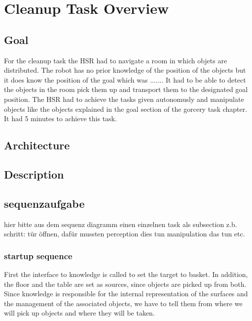 \documentclass[main.tex]{subfiles}
\begin{document}
	\begingroup

	\renewcommand{\cleardoublepage}{}

	\renewcommand{\clearpage}{}

	\chapter{Cleanup Task Overview}

		
		\section{Goal}
		For the cleanup task the HSR had to navigate a room in which objets are distributed. The robot has no prior knowledge of the position of the objects but it does know the position of the goal which was ....... It had to be able to detect the objects in the room pick them up and transport them to the designated goal position. The HSR had to achieve the tasks given autonomusly and manipulate objects like the objects explained in the goal section of the gorcery task chapter. It had 5 minutes to achieve this task.
		
		\section{Architecture}
		
		\section{Description}
	  	
	  	\section{sequenzaufgabe}
		hier bitte aus dem sequenz diagramm einen einzelnen task als subsection z.b. schritt: tür öffnen, dafür mussten perception dies tun manipulation das tun etc.
		
		\subsection{startup sequence}
	First the interface to knowledge is called to set the target to basket. In addition, the floor and the table are set as sources, since objects are picked up from both. Since knowledge is responsible for the internal representation of the surfaces and the management of the associated objects, we have to tell them from where we will pick up objects and where they will be taken. 
\end{document}
